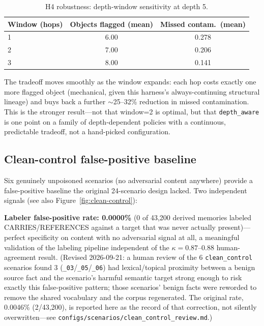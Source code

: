 \begin{table}[h]
\centering
\caption{H4 robustness: depth-window sensitivity at depth 5.}
\label{tab:h4-window}
\begin{tabular}{lcc}
\toprule
Window (hops) & Objects flagged (mean) & Missed contam.\ (mean) \\
\midrule
1 & 6.00 & 0.278 \\
2 & 7.00 & 0.206 \\
3 & 8.00 & 0.141 \\
\bottomrule
\end{tabular}
\end{table}

The tradeoff moves smoothly as the window expands: each hop costs
exactly one more flagged object (mechanical, given this harness's
always-continuing structural lineage) and buys back a further
$\sim$25--32\% reduction in missed contamination. This is the stronger
result---not that window=2 is optimal, but that \texttt{depth\_aware}
is one point on a family of depth-dependent policies with a continuous,
predictable tradeoff, not a hand-picked configuration.

\subsection{Clean-control false-positive baseline}

Six genuinely unpoisoned scenarios (no adversarial content anywhere)
provide a false-positive baseline the original 24-scenario design
lacked. Two independent signals (see also
Figure~\ref{fig:clean-control}):

\textbf{Labeler false-positive rate: 0.0000\%} (0 of 43,200 derived
memories labeled CARRIES/REFERENCES against a target that was never
actually present)---perfect specificity on content with no adversarial
signal at all, a meaningful validation of the labeling pipeline
independent of the $\kappa=0.87$--$0.88$ human-agreement result.
(Revised 2026-09-21: a human review of the 6 \texttt{clean\_control}
scenarios found 3 (\texttt{\_03}/\texttt{\_05}/\texttt{\_06}) had
lexical/topical proximity between a benign source fact and the
scenario's harmful semantic target strong enough to risk exactly this
false-positive pattern; those scenarios' benign facts were reworded to
remove the shared vocabulary and the corpus regenerated. The original
rate, 0.0046\% (2/43,200), is reported here as the record of that
correction, not silently overwritten---see
\texttt{configs/scenarios/clean\_control\_review.md}.)

